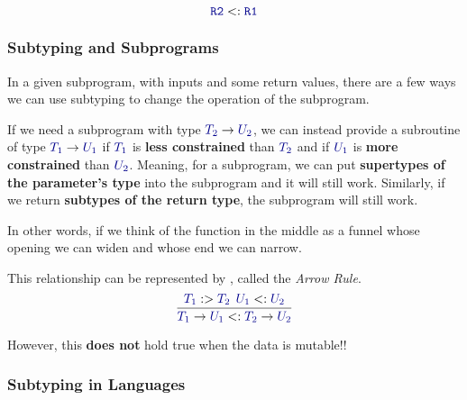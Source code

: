 \begin{equation*}
  \mathtt{\SemanticType{R2}} <: \mathtt{\SemanticType{R1}}
\end{equation*}

\subsubsection{Subtyping and Subprograms}\label{subsubsec:Subtyping_and_Subprograms}
In a given subprogram, with  inputs and some return values, there are a few ways we can use subtyping to change the operation of the subprogram.

If we need a subprogram with type $\SemanticType{T_{2}} \rightarrow \SemanticType{U_{2}}$, we can instead provide a subroutine of type $\SemanticType{T_{1}} \rightarrow \SemanticType{U_{1}}$ if $\SemanticType{T_1}$ is \textbf{less constrained} than $\SemanticType{T_{2}}$ and if $\SemanticType{U_{1}}$ is \textbf{more constrained} than $\SemanticType{U_{2}}$.
Meaning, for a subprogram, we can put \textbf{supertypes of the parameter's type} into the subprogram and it will still work.
Similarly, if we return \textbf{subtypes of the return type}, the subprogram will still work.

In other words, if we think of the function in the middle as a funnel whose opening we can widen and whose end we can narrow.

This relationship can be represented by , called the \emph{Arrow Rule}.
\begin{equation}\label{eq:Arrow_Rule}
  \dfrac{\SemanticType{T_{1}} :> \SemanticType{T_{2}} \:\: \SemanticType{U_{1}} <: \SemanticType{U_{2}}}{\SemanticType{T_{1}} \rightarrow \SemanticType{U_{1}} <: \SemanticType{T_{2}} \rightarrow \SemanticType{U_{2}}}
\end{equation}

\begin{remark*}
  However, this \textbf{does not} hold true when the data is mutable!!
\end{remark*}

\subsubsection{Subtyping in Languages}\label{subsubsec:Subtyping_in_Languages}


